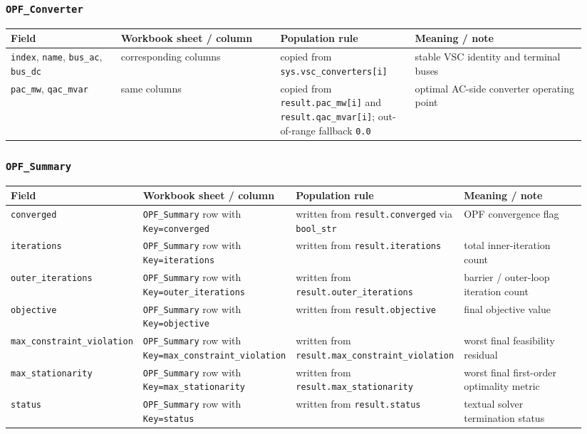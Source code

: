 \subsubsection*{\texttt{OPF\_Converter}}

\begin{longtable}{@{}L{0.18\linewidth}L{0.26\linewidth}L{0.22\linewidth}L{0.28\linewidth}@{}}
\toprule
Field & Workbook sheet / column & Population rule & Meaning / note \\
\midrule
\endhead
\texttt{index}, \texttt{name}, \texttt{bus\_ac}, \texttt{bus\_dc} & corresponding columns & copied from \texttt{sys.vsc\_converters[i]} & stable VSC identity and terminal buses \\
\texttt{pac\_mw}, \texttt{qac\_mvar} & same columns & copied from \texttt{result.pac\_mw[i]} and \texttt{result.qac\_mvar[i]}; out-of-range fallback \texttt{0.0} & optimal AC-side converter operating point \\
\bottomrule
\end{longtable}

\subsubsection*{\texttt{OPF\_Summary}}

\begin{longtable}{@{}L{0.18\linewidth}L{0.26\linewidth}L{0.22\linewidth}L{0.28\linewidth}@{}}
\toprule
Field & Workbook sheet / column & Population rule & Meaning / note \\
\midrule
\endhead
\texttt{converged} & \texttt{OPF\_Summary} row with \texttt{Key=converged} & written from \texttt{result.converged} via \texttt{bool\_str} & OPF convergence flag \\
\texttt{iterations} & \texttt{OPF\_Summary} row with \texttt{Key=iterations} & written from \texttt{result.iterations} & total inner-iteration count \\
\texttt{outer\_iterations} & \texttt{OPF\_Summary} row with \texttt{Key=outer\_iterations} & written from \texttt{result.outer\_iterations} & barrier / outer-loop iteration count \\
\texttt{objective} & \texttt{OPF\_Summary} row with \texttt{Key=objective} & written from \texttt{result.objective} & final objective value \\
\texttt{max\_constraint\_violation} & \texttt{OPF\_Summary} row with \texttt{Key=max\_constraint\_violation} & written from \texttt{result.max\_constraint\_violation} & worst final feasibility residual \\
\texttt{max\_stationarity} & \texttt{OPF\_Summary} row with \texttt{Key=max\_stationarity} & written from \texttt{result.max\_stationarity} & worst final first-order optimality metric \\
\texttt{status} & \texttt{OPF\_Summary} row with \texttt{Key=status} & written from \texttt{result.status} & textual solver termination status \\
\bottomrule
\end{longtable}

